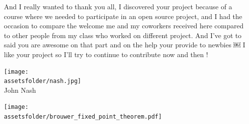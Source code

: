 \documentclass{beamer}
\newcommand{\assetsfolder}{./assets}
\begin{document}
\begin{frame}
    \begin{footnotesize}
        \begin{tcolorbox}[colback=github,colframe=blue!40!black,title=
                Julie Rymer - \href{https://gitter.im/Axelrod-Python/Axelrod?at=591388592b926f8a6741435d}
                {@Chadys} - (10 May 2017):
    ]
                And I really wanted to thank you all, I discovered your project because of a
                course where we needed to participate in an open source project, and I had the
                occasion to compare the welcome me and my coworkers received here compared to
                other people from my class who worked on different project. And I've got to said
                you are awesome on that part and on the help your provide to newbies ￼ I like
                your project so I'll try to continue to contribute now and then !
       \end{tcolorbox}
    \end{footnotesize}

 \end{frame}

 \begin{frame}
    \begin{center}
        \texttt{[image: \\assetsfolder/nash.jpg]}
        \\
        John Nash
    \end{center}
 \end{frame}

 \begin{frame}
    \begin{center}
        \texttt{[image: \\assetsfolder/brouwer\_fixed\_point\_theorem.pdf]}
    \end{center}
 \end{frame}
\end{document}
